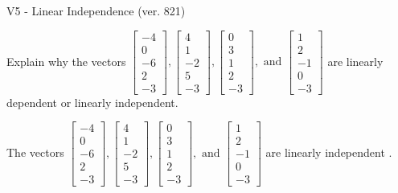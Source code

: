 \begin{exercise}
  \begin{exerciseTitle}V5 - Linear Independence (ver. 821)\end{exerciseTitle}
  \begin{exerciseStatement}
    Explain why the vectors \(\left[\begin{array}{r}
-4 \\
0 \\
-6 \\
2 \\
-3
\end{array}\right] , \left[\begin{array}{r}
4 \\
1 \\
-2 \\
5 \\
-3
\end{array}\right] , \left[\begin{array}{r}
0 \\
3 \\
1 \\
2 \\
-3
\end{array}\right] , \text{ and } \left[\begin{array}{r}
1 \\
2 \\
-1 \\
0 \\
-3
\end{array}\right]\) are linearly dependent or linearly independent.	


  \end{exerciseStatement}
  \begin{exerciseAnswer}
   The vectors \(\left[\begin{array}{r}
-4 \\
0 \\
-6 \\
2 \\
-3
\end{array}\right] , \left[\begin{array}{r}
4 \\
1 \\
-2 \\
5 \\
-3
\end{array}\right] , \left[\begin{array}{r}
0 \\
3 \\
1 \\
2 \\
-3
\end{array}\right] , \text{ and } \left[\begin{array}{r}
1 \\
2 \\
-1 \\
0 \\
-3
\end{array}\right]\) are 
  	 linearly independent  .
  


  \end{exerciseAnswer}
\end{exercise}